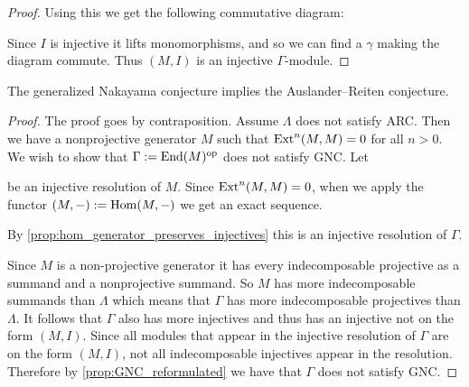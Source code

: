 \begin{prop}
\begin{proof}
		Using this we get the following commutative diagram:
		\begin{center}
		\end{center}
		Since $I$ is injective it lifts monomorphisms, and so we can find a $\gamma$ making the diagram commute. Thus $(M, I)$ is an injective $\Gamma$-module.
	\end{proof}
\end{prop}

\begin{theorem}\label{thm:GNC_implies_ARC}
	The generalized Nakayama conjecture implies the Auslander--Reiten conjecture.
	\begin{proof}
		The proof goes by contraposition. Assume $\Lambda$ does not satisfy ARC. Then we have a nonprojective generator $M$ such that $\operatorname{Ext}^n(M, M)=0$ for all $n>0$. We wish to show that $\Gamma := \operatorname{End}(M)^{\operatorname{op}}$ does not satisfy GNC. Let
		\begin{center}
		\end{center}
		be an injective resolution of $M$. Since $\operatorname{Ext}^n(M,M)=0$, when we apply the functor $(M,-):=\operatorname{Hom}(M,-)$ we get an exact sequence.
		\begin{center}
		\end{center}
		By \cref{prop:hom_generator_preserves_injectives} this is an injective resolution of $\Gamma$.
		
		Since $M$ is a non-projective generator it has every indecomposable projective as a summand and a nonprojective summand. So $M$ has more indecomposable summands than $\Lambda$ which means that $\Gamma$ has more indecomposable projectives than $\Lambda$. It follows that $\Gamma$ also has more injectives and thus has an injective not on the form $(M, I)$. Since all modules that appear in the injective resolution of $\Gamma$ are on the form $(M, I)$, not all indecomposable injectives appear in the resolution. Therefore by \cref{prop:GNC_reformulated} we have that $\Gamma$ does not satisfy GNC.
	\end{proof}
\end{theorem}

